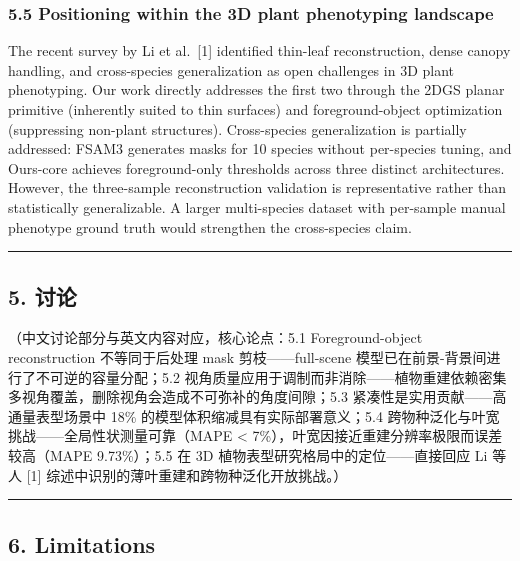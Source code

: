 \documentclass[11pt,a4paper]{article}
\begin{document}
\subsubsection{5.5 Positioning within the 3D plant phenotyping
landscape}\label{positioning-within-the-3d-plant-phenotyping-landscape-1}

The recent survey by Li et al.~{[}1{]} identified thin-leaf
reconstruction, dense canopy handling, and cross-species generalization
as open challenges in 3D plant phenotyping. Our work directly addresses
the first two through the 2DGS planar primitive (inherently suited to
thin surfaces) and foreground-object optimization (suppressing non-plant
structures). Cross-species generalization is partially addressed: FSAM3
generates masks for 10 species without per-species tuning, and Ours-core
achieves foreground-only thresholds across three distinct architectures.
However, the three-sample reconstruction validation is representative
rather than statistically generalizable. A larger multi-species dataset
with per-sample manual phenotype ground truth would strengthen the
cross-species claim.

\begin{center}\rule{0.5\linewidth}{0.5pt}\end{center}

\subsection{5. 讨论}\label{ux8ba8ux8bba}

（中文讨论部分与英文内容对应，核心论点：5.1 Foreground-object
reconstruction 不等同于后处理 mask 剪枝------full-scene
模型已在前景-背景间进行了不可逆的容量分配；5.2
视角质量应用于调制而非消除------植物重建依赖密集多视角覆盖，删除视角会造成不可弥补的角度间隙；5.3
紧凑性是实用贡献------高通量表型场景中 18\%
的模型体积缩减具有实际部署意义；5.4
跨物种泛化与叶宽挑战------全局性状测量可靠（MAPE \textless{}
7\%），叶宽因接近重建分辨率极限而误差较高（MAPE 9.73\%）；5.5 在 3D
植物表型研究格局中的定位------直接回应 Li 等人 {[}1{]}
综述中识别的薄叶重建和跨物种泛化开放挑战。）

\begin{center}\rule{0.5\linewidth}{0.5pt}\end{center}

\subsection{6. Limitations}\label{limitations}
\end{document}
